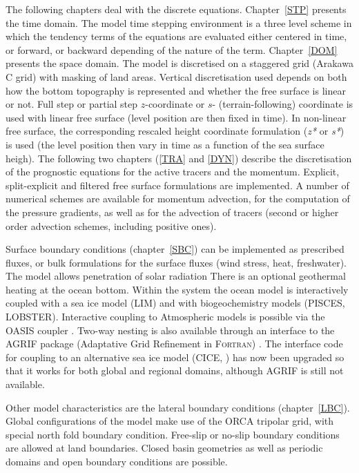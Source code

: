 The following chapters deal with the discrete equations. Chapter~\ref{STP} presents the 
time domain. The model time stepping environment is a three level scheme in which 
the tendency terms of the equations are evaluated either centered  in time, or forward, 
or backward depending of the nature of the term.
Chapter~\ref{DOM} presents the space domain. The model is discretised on a staggered 
grid (Arakawa C grid) with masking of land areas. Vertical discretisation used depends 
on both how the bottom topography is represented and whether the free surface is linear or not. 
Full step or partial step $z$-coordinate or $s$- (terrain-following) coordinate is used 
with linear free surface (level position are then fixed in time). In non-linear free surface, 
the corresponding rescaled height coordinate formulation (\textit{z*} or \textit{s*}) is used 
(the level position then vary in time as a function of the sea surface heigh). 
The following two chapters (\ref{TRA} and \ref{DYN}) describe the discretisation of the 
prognostic equations for the active tracers and the momentum. Explicit, split-explicit 
and filtered free surface formulations are implemented. 
A number of numerical schemes are available for momentum advection, for the computation 
of the pressure gradients, as well as for the advection of tracers (second or higher 
order advection schemes, including positive ones).

Surface boundary conditions (chapter~\ref{SBC}) can be implemented as prescribed
fluxes, or bulk formulations for the surface fluxes (wind stress, heat, freshwater). The 
model allows penetration of solar radiation  There is an optional geothermal heating at 
the ocean bottom. Within the \NEMO system the ocean model is interactively coupled 
with a sea ice model (LIM) and with biogeochemistry models (PISCES, LOBSTER). 
Interactive coupling to Atmospheric models is possible via the OASIS coupler 
\citep{OASIS2006}. Two-way nesting is also available through an interface to the
AGRIF package (Adaptative Grid Refinement in \textsc{Fortran}) \citep{Debreu_al_CG2008}.
The interface code for coupling to an alternative sea ice model (CICE, \citet{Hunke2008})
has now been upgraded so that it works for both global and regional domains, although AGRIF 
is still not available.

Other model characteristics are the lateral boundary conditions (chapter~\ref{LBC}).  
Global configurations of the model make use of the ORCA tripolar grid, with special north 
fold boundary condition. Free-slip or no-slip boundary conditions are allowed at land 
boundaries. Closed basin geometries as well as periodic domains and open boundary 
conditions are possible. 

